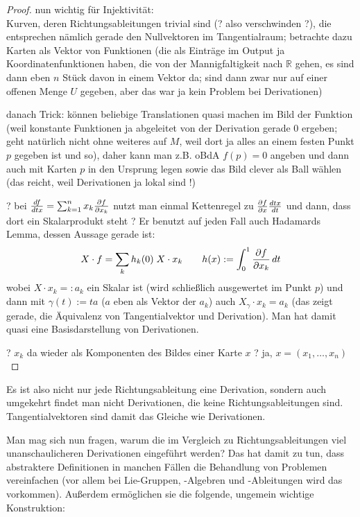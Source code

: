 \documentclass[../H_Analysis_main.tex]{subfiles}
\begin{document}
\begin{proof}
nun wichtig für Injektivität:\\
Kurven, deren Richtungsableitungen trivial sind (? also verschwinden ?), die entsprechen nämlich gerade den Nullvektoren im Tangentialraum; betrachte dazu Karten als Vektor von Funktionen (die als Einträge im Output ja Koordinatenfunktionen haben, die von der Mannigfaltigkeit nach $\mathbb{R}$ gehen, es sind dann eben $n$ Stück davon in einem Vektor da; sind dann zwar nur auf einer offenen Menge $U$ gegeben, aber das war ja kein Problem bei Derivationen)

danach Trick: können beliebige Translationen quasi machen im Bild der Funktion (weil konstante Funktionen ja abgeleitet von der Derivation gerade 0 ergeben; geht natürlich nicht ohne weiteres auf $M$, weil dort ja alles an einem festen Punkt $p$ gegeben ist und so), daher kann man z.B. oBdA $f(p) = 0$ angeben und dann auch mit Karten $p$ in den Ursprung legen sowie das Bild clever als Ball wählen (das reicht, weil Derivationen ja lokal sind !)


? bei $\dv{f}{tx} = \sum_{k = 1}^n x_k \pdv{f}{x_k}$ nutzt man einmal Kettenregel zu $\pdv{f}{x} \dv{tx}{t}$ und dann, dass dort ein Skalarprodukt steht ? Er benutzt auf jeden Fall auch Hadamards Lemma, dessen Aussage gerade ist:
\begin{equation}
X \cdot f = \sum_k h_k(0) \; X \cdot x_k \qquad h(x) := \int_0^1 \pdv{f}{x_k}(tx) \, dt
\end{equation}
wobei $X \cdot x_k =: a_k$ ein Skalar ist (wird schließlich ausgewertet im Punkt $p$) und dann mit $\gamma(t) := t a$ ($a$ eben als Vektor der $a_k$) auch $X_{\gamma} \cdot x_k = a_k$ (das zeigt gerade, die Äquivalenz von Tangentialvektor und Derivation). Man hat damit quasi eine Basisdarstellung von Derivationen.

? $x_k$ da wieder als Komponenten des Bildes einer Karte $x$ ? ja, $x = (x_1, \dots, x_n)$
\end{proof}

Es ist also nicht nur jede Richtungsableitung eine Derivation, sondern auch umgekehrt findet man nicht Derivationen, die keine Richtungsableitungen sind. Tangentialvektoren sind damit das Gleiche wie Derivationen.

Man mag sich nun fragen, warum die im Vergleich zu Richtungsableitungen viel unanschaulicheren Derivationen eingeführt werden? Das hat damit zu tun, dass abstraktere Definitionen in manchen Fällen die Behandlung von Problemen vereinfachen (vor allem bei Lie-Gruppen, -Algebren und -Ableitungen wird das vorkommen). Außerdem ermöglichen sie die folgende, ungemein wichtige Konstruktion:
\end{document}
